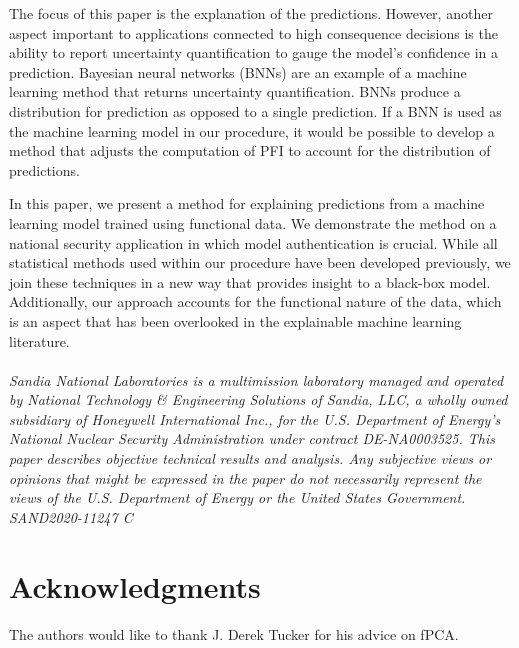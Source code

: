 \documentclass[letterpaper]{article}
\begin{document}
The focus of this paper is the explanation of the predictions. However, another aspect important to applications connected to high consequence decisions is the ability to report uncertainty quantification to gauge the model's confidence in a prediction. Bayesian neural networks (BNNs) are an example of a machine learning method that returns uncertainty quantification. BNNs produce a distribution for prediction as opposed to a single prediction. If a BNN is used as the machine learning model in our procedure, it would be possible to develop a method that adjusts the computation of PFI to account for the distribution of predictions.

In this paper, we present a method for explaining predictions from a machine learning model trained using functional data. We demonstrate the method on a national security application in which model authentication is crucial. While all statistical methods used within our procedure have been developed previously, we join these techniques in a new way that provides insight to a black-box model. Additionally, our approach accounts for the functional nature of the data, which is an aspect that has been overlooked in the explainable machine learning literature.\\
\\
\textit{Sandia National Laboratories is a multimission laboratory managed and operated by National Technology \& Engineering Solutions of Sandia, LLC, a wholly owned subsidiary of Honeywell International Inc., for the U.S. Department of Energy's National Nuclear Security Administration under contract DE-NA0003525. This paper describes objective technical results and analysis. Any subjective views or opinions that might be expressed in the paper do not necessarily represent the views of the U.S. Department of Energy or the United States Government. SAND2020-11247 C}

\section*{Acknowledgments}

The authors would like to thank J. Derek Tucker for his advice on fPCA.



\end{document}
